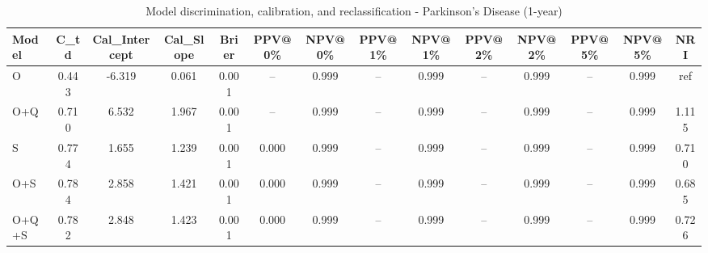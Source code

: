 \begin{table}[htbp]
\centering
\small
\caption{Model discrimination, calibration, and reclassification - Parkinson's Disease (1-year)}
\label{tab:perf_pd_1y}
\begin{tabular}{lccccccccccccc}
\toprule
Model & C\_td & Cal\_Intercept & Cal\_Slope & Brier & PPV@0\% & NPV@0\% & PPV@1\% & NPV@1\% & PPV@2\% & NPV@2\% & PPV@5\% & NPV@5\% & NRI \\
\midrule
O & 0.443 & -6.319 & 0.061 & 0.001 & -- & 0.999 & -- & 0.999 & -- & 0.999 & -- & 0.999 & ref \\
O+Q & 0.710 & 6.532 & 1.967 & 0.001 & -- & 0.999 & -- & 0.999 & -- & 0.999 & -- & 0.999 & 1.115 \\
S & 0.774 & 1.655 & 1.239 & 0.001 & 0.000 & 0.999 & -- & 0.999 & -- & 0.999 & -- & 0.999 & 0.710 \\
O+S & 0.784 & 2.858 & 1.421 & 0.001 & 0.000 & 0.999 & -- & 0.999 & -- & 0.999 & -- & 0.999 & 0.685 \\
O+Q+S & 0.782 & 2.848 & 1.423 & 0.001 & 0.000 & 0.999 & -- & 0.999 & -- & 0.999 & -- & 0.999 & 0.726 \\
\bottomrule
\end{tabular}
\end{table}